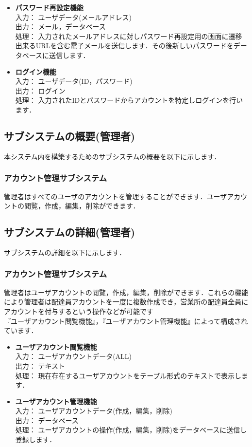 \documentclass[a4j,titlepage]{jarticle}
\begin{document}
\begin{itemize}
\item \textbf{パスワード再設定機能} \\
入力： ユーザデータ(メールアドレス) \\
出力： メール，データベース \\
処理： 入力されたメールアドレスに対しパスワード再設定用の画面に遷移出来るURLを含む電子メールを送信します．その後新しいパスワードをデータベースに送信します．
\item \textbf{ログイン機能} \\
入力： ユーザデータ(ID，パスワード) \\
出力： ログイン \\
処理： 入力されたIDとパスワードからアカウントを特定しログインを行います．
\end{itemize}

\subsection{サブシステムの概要(管理者)}
本システム内を構築するためのサブシステムの概要を以下に示します．

\subsubsection{アカウント管理サブシステム}
管理者はすべてのユーザのアカウントを管理することができます．ユーザアカウントの閲覧，作成，編集，削除ができます．

\subsection{サブシステムの詳細(管理者)}
サブシステムの詳細を以下に示します．

\subsubsection{アカウント管理サブシステム}
管理者はユーザアカウントの閲覧，作成，編集，削除ができます．これらの機能により管理者は配達員アカウントを一度に複数作成でき，営業所の配達員全員にアカウントを付与するという操作などが可能です\\
『ユーザアカウント閲覧機能』，『ユーザアカウント管理機能』によって構成されています．
\begin{itemize}
\item \textbf{ユーザアカウント閲覧機能} \\
入力： ユーザアカウントデータ(ALL) \\
出力： テキスト \\
処理： 現在存在するユーザアカウントをテーブル形式のテキストで表示します．
\item \textbf{ユーザアカウント管理機能} \\
入力： ユーザアカウントデータ(作成，編集，削除) \\
出力： データベース \\
処理： ユーザアカウントの操作(作成，編集，削除)をデータベースに送信し登録します．
\end{itemize}
\end{document}
